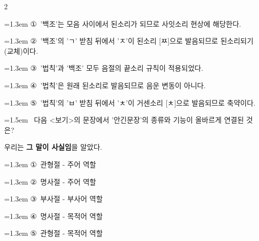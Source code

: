 \documentclass[10pt, a4paper]{article}
\begin{document}
\begin{multicols}{2}
\begin{minipage}{\columnwidth}
\vspace{0.5mm}
{\hangindent=1.3em  \noindent\hspace{0.3em}①~'백조'는 모음 사이에서 된소리가 되므로 사잇소리 현상에 해당한다.\par}
{\hangindent=1.3em  \noindent\hspace{0.3em}②~'백조'의 'ㄱ' 받침 뒤에서 'ㅈ'이 된소리 [ㅉ]으로 발음되므로 된소리되기(교체)이다.\par}
{\hangindent=1.3em  \noindent\hspace{0.3em}③~'법칙'과 '백조' 모두 음절의 끝소리 규칙이 적용되었다.\par}
{\hangindent=1.3em  \noindent\hspace{0.3em}④~'법칙'은 원래 된소리로 발음되므로 음운 변동이 아니다.\par}
{\hangindent=1.3em  \noindent\hspace{0.3em}⑤~'법칙'의 'ㅂ' 받침 뒤에서 'ㅊ'이 거센소리 [ㅊ]으로 발음되므로 축약이다.\par}
\vspace{4mm}
\end{minipage}
\par

\noindent\begin{minipage}{\columnwidth}
\vspace{2mm}
{\hangindent=1.5em  ~다음 <보기>의 문장에서 '안긴문장'의 종류와 기능이 올바르게 연결된 것은?\par}

\vspace{1mm}
\begin{boxibox}
우리는 \textbf{그 말이 사실임}을 알았다. \\
\end{boxibox}
\vspace{1mm}

\vspace{0.5mm}
{\hangindent=1.3em  \noindent\hspace{0.3em}①~관형절 - 주어 역할\par}
{\hangindent=1.3em  \noindent\hspace{0.3em}②~명사절 - 주어 역할\par}
{\hangindent=1.3em  \noindent\hspace{0.3em}③~부사절 - 부사어 역할\par}
{\hangindent=1.3em  \noindent\hspace{0.3em}④~명사절 - 목적어 역할\par}
{\hangindent=1.3em  \noindent\hspace{0.3em}⑤~관형절 - 목적어 역할\par}
\vspace{4mm}
\end{minipage}
\par


\end{multicols}
\end{document}
